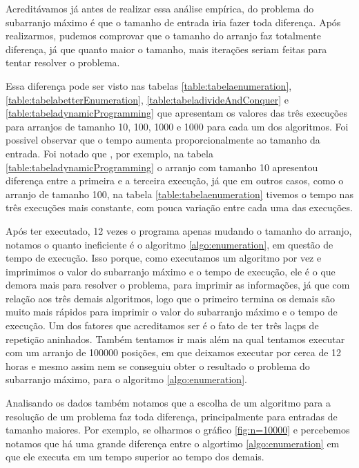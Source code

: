 \documentclass[
	12pt,				%
	oneside,   	        %
	a4paper,			%
	english,			%
	french,				%
	spanish,			%
	brazil,				%
	]{pacotes/abntex2}
\begin{document}
Acreditávamos já antes de realizar essa análise empírica, do problema do subarranjo máximo é que o tamanho de entrada iria fazer toda diferença. Após realizarmos, pudemos comprovar que o tamanho do arranjo faz totalmente diferença, já que quanto maior o tamanho, mais iterações seriam feitas para tentar resolver o problema. 

Essa diferença pode ser visto nas tabelas \ref{table:tabelaenumeration}, \ref{table:tabelabetterEnumeration}, \ref{table:tabeladivideAndConquer} e \ref{table:tabeladynamicProgramming} que apresentam os valores das três execuções para arranjos de tamanho 10, 100, 1000 e 1000 para cada um dos algoritmos. Foi possivel observar que o tempo aumenta proporcionalmente ao tamanho da entrada. Foi notado que , por exemplo, na tabela \ref{table:tabeladynamicProgramming} o arranjo com tamanho 10 apresentou diferença entre a primeira e a terceira execução, já que em outros casos, como o arranjo de tamanho 100, na tabela \ref{table:tabelaenumeration} tivemos o tempo nas três execuções mais constante, com pouca variação entre cada uma das execuções.

Após ter executado, 12 vezes o programa apenas mudando o tamanho do arranjo, notamos o quanto ineficiente é o algoritmo \ref{algo:enumeration}, em questão de tempo de execução. Isso porque, como executamos um algoritmo por vez e imprimimos o valor do subarranjo máximo e o tempo de execução, ele é o que demora mais para resolver o problema, para imprimir as informações, já que com relação aos três demais algoritmos, logo que o primeiro termina os demais são muito mais rápidos para imprimir o valor do subarranjo máximo e o tempo de execução. Um dos fatores que acreditamos ser é o fato de ter três laçps de repetição aninhados. Também tentamos ir mais além na qual tentamos executar com um arranjo de 100000 posições, em que deixamos executar por cerca de 12 horas e mesmo assim nem se conseguiu obter o resultado o problema do subarranjo máximo, para o algoritmo \ref{algo:enumeration}.

Analisando os dados também notamos que a escolha de um algoritmo para a resolução de um problema faz toda diferença, principalmente para entradas de tamanho maiores. Por exemplo, se olharmos o gráfico \ref{fig:n=10000} e percebemos notamos que há uma grande diferença entre o algortimo \ref{algo:enumeration} em que ele executa em um tempo superior ao tempo dos demais.
\end{document}
